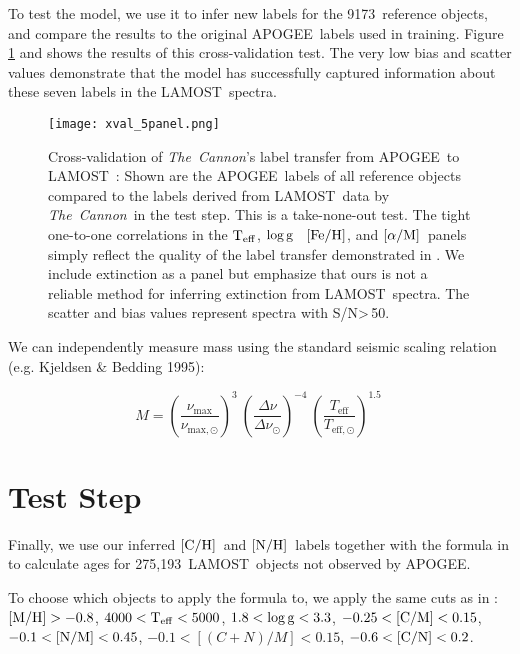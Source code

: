 \documentclass[12pt, preprint]{aastex}
\newcommand{\tc}{\textsl{The~Cannon}}
\newcommand{\apogee}{APOGEE}
\newcommand{\lamost}{LAMOST}
\newcommand{\teff}{\mbox{$\rm T_{eff}$}}
\newcommand{\logg}{\mbox{$\rm \log g$}}
\newcommand{\mh}{\mbox{$\rm [M/H]$}}
\newcommand{\feh}{\mbox{$\rm [Fe/H]$}}
\newcommand{\alpham}{\mbox{$\rm [\alpha/M]$}}
\newcommand{\cm}{\mbox{$\rm [C/M]$}}
\newcommand{\carbon}{\mbox{$\rm [C/H]$}}
\newcommand{\cn}{\mbox{$\rm [C/N]$}}
\newcommand{\nitrogen}{\mbox{$\rm [N/H]$}}
\newcommand{\nm}{\mbox{$\rm [N/M]$}}
\newcommand{\ntrobj}{9173}
\newcommand{\ntestobj}{275,193}
\newcommand{\snr}{S/N}
\begin{document}
To test the model, we use it to infer new labels for the
\ntrobj\ reference objects, and compare the results 
to the original \apogee\ labels used in training.
Figure \ref{fig:cross-validation} and 
shows the results of
this cross-validation test. The very low bias
and scatter values demonstrate 
that the model has successfully
captured information about these seven labels in the
\lamost\ spectra.

\begin{figure}[!hp]
\centering
\texttt{[image: xval\_5panel.png]}
\caption{Cross-validation of \tc 's label transfer from \apogee\ to \lamost~: Shown are the \apogee\ labels of all reference objects compared to the labels derived from \lamost\ data by \tc\ in the test step. This is a take-none-out test. The tight one-to-one correlations in the \teff , \logg~ \feh, and \alpham\ panels simply reflect the quality of the label transfer demonstrated in \citet{Ho2016}.
We include extinction as a panel
but emphasize that ours is not a reliable method for 
inferring extinction from \lamost\ spectra.
The scatter and bias values represent spectra with \snr\textgreater\,50.
}
\label{fig:cross-validation}
\end{figure}

We can independently measure mass using the standard seismic scaling relation (e.g. Kjeldsen \& Bedding 1995):

\begin{equation} \label{eq:mass}
M= \left( \frac{\nu_{\mathrm{max}}}{\nu_{\mathrm{max,\odot}}}\right)^3\  \left( \frac{\Delta \nu}{\Delta \nu_{\odot}}\right)^{-4} \ \left( \frac{T_{\mathrm{eff}}}{T_{\mathrm{eff,\odot}}}\right)^{1.5} \ 
\end{equation}





\section{Test Step}
\label{test-step}

Finally, we use our inferred \carbon\ and \nitrogen\ 
labels together with the formula in \citet{Martig2016}
to calculate ages for \ntestobj\ \lamost\ objects not observed by \apogee.

To choose which objects to apply the formula to,
we apply the same cuts as in \citet{Martig2016}:
$\mh > -0.8$, $4000 < \teff < 5000$, $1.8 < \logg < 3.3$,
$-0.25 < \cm < 0.15$, $-0.1 < \nm < 0.45$, $-0.1 < [(C+N)/M] < 0.15$,
$-0.6 < \cn < 0.2$. 
\end{document}
